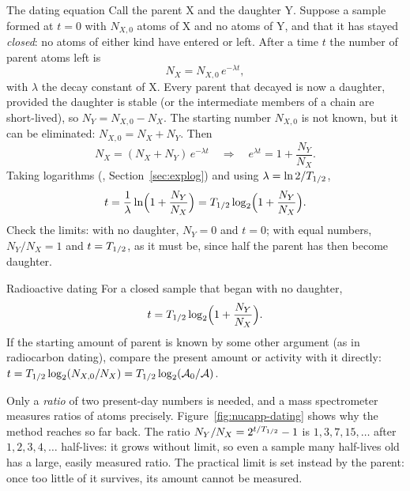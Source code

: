 \begin{derivbox}{The dating equation}
Call the parent X and the daughter Y. Suppose a sample formed at $t=0$ with $N_{X,0}$ atoms of X and no
atoms of Y, and that it has stayed \emph{closed}: no atoms of either kind have entered or left. After a
time $t$ the number of parent atoms left is
\[
N_X=N_{X,0}\,e^{-\lambda t},
\]
with $\lambda$ the decay constant of X. Every parent that decayed is now a daughter, provided the
daughter is stable (or the intermediate members of a chain are short-lived), so $N_Y=N_{X,0}-N_X$. The
starting number $N_{X,0}$ is not known, but it can be eliminated: $N_{X,0}=N_X+N_Y$. Then
\[
N_X=(N_X+N_Y)\,e^{-\lambda t}\quad\Longrightarrow\quad e^{\lambda t}=1+\frac{N_Y}{N_X}.
\]
Taking logarithms (, Section~\ref{sec:explog}) and using $\lambda=\ln2/T_{1/2}$,
\[
t=\frac1\lambda\ln\!\Big(1+\frac{N_Y}{N_X}\Big)=T_{1/2}\log_2\!\Big(1+\frac{N_Y}{N_X}\Big).
\]
Check the limits: with no daughter, $N_Y=0$ and $t=0$; with equal numbers, $N_Y/N_X=1$ and
$t=T_{1/2}$, as it must be, since half the parent has then become daughter.
\end{derivbox}

\begin{keybox}{Radioactive dating}
For a closed sample that began with no daughter,
\[
t=T_{1/2}\log_2\!\Big(1+\frac{N_Y}{N_X}\Big).
\]
If the starting amount of parent is known by some other argument (as in radiocarbon dating), compare
the present amount or activity with it directly:
$t=T_{1/2}\log_2(N_{X,0}/N_X)=T_{1/2}\log_2(\mathcal{A}_0/\mathcal{A})$.
\end{keybox}

Only a \emph{ratio} of two present-day numbers is needed, and a mass spectrometer measures ratios of
atoms precisely. Figure~\ref{fig:nucapp-dating} shows why the method reaches so far back. The ratio
$N_Y/N_X=2^{t/T_{1/2}}-1$ is $1,3,7,15,\dots$ after $1,2,3,4,\dots$ half-lives: it grows without limit,
so even a sample many half-lives old has a large, easily measured ratio. The practical limit is set
instead by the parent: once too little of it survives, its amount cannot be measured.

\begin{figure}[htbp]
\centering
{}
\end{figure}


